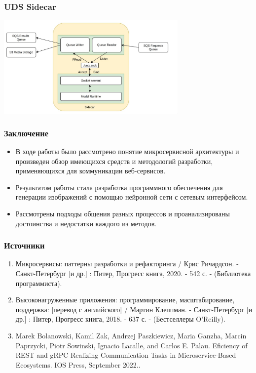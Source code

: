 \documentclass{beamer}
\begin{document}
\begin{frame}
	\frametitle{UDS Sidecar}
	\centering
	\includegraphics[height=5cm]{img/side3.jpg}
\end{frame}



\begin{frame}
	\frametitle{Заключение}
	\begin{itemize}
	\item В ходе работы было рассмотрено понятие микросервисной архитектуры и произведен обзор имеющихся средств и методологий разработки, применяющихся для коммуникации веб-сервисов.
	\item Результатом работы стала разработка программного обеспечения для генерации изображений с помощью нейронной сети с сетевым интерфейсом. 
	\item Рассмотрены подходы общения разных процессов и проанализированы достоинства и недостатки каждого из методов.
	\end{itemize}
\end{frame}

\begin{frame}
	\frametitle{Источники}
	\begin{enumerate}
		\item Микросервисы: паттерны разработки и рефакторинга / Крис Ричардсон. - Санкт-Петербург [и др.] : Питер, Прогресс книга, 2020. - 542 с. -  (Библиотека программиста). 
		\item Высоконагруженные приложения: программирование, масштабирование, поддержка: [перевод с английского] / Мартин Клеппман. - Санкт-Петербург [и др.] : Питер, Прогресс книга, 2018. - 637 с. -  (Бестселлеры O'Reilly). 
		\item Marek Bolanowski, Kamil Zak, Andrzej Paszkiewicz, Maria Ganzha, Marcin Paprzycki, Piotr Sowinski, Ignacio Lacalle, and Carlos E. Palau. Eficiency of REST and gRPC Realizing Communication Tasks in Microservice-Based Ecosystems. IOS Press, September 2022..
	\end{enumerate}
\end{frame}
\end{document}
